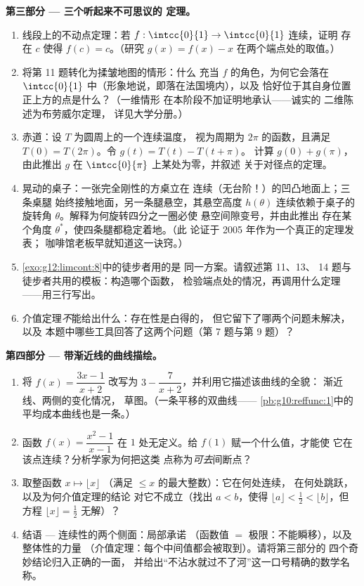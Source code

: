 \begin{problem}
\medskip
\noindent\textbf{第三部分 --- 三个听起来不可思议的
定理。}
\begin{enumerate}[resume]
  \item 线段上的不动点定理：若
        $f : \intcc{0}{1} \to \intcc{0}{1}$ 连续，证明
        存在 $c$ 使得 $f(c) = c$。（研究
        $g(x) = f(x) - x$ 在两个端点处的取值。）
  \item 将第 11 题转化为揉皱地图的情形：什么
        充当 $f$ 的角色，为何它会落在
        $\intcc{0}{1}$ 中（形象地说，即落在法国境内），以及
        恰好位于其自身位置正上方的点是什么？（一维情形
        在本阶段不加证明地承认——诚实的
        二维陈述为布劳威尔定理，
        详见大学分册。）
  \item 赤道：设 $T$ 为圆周上的一个连续温度，
        视为周期为 $2\pi$ 的函数，且满足
        $T(0) = T(2\pi)$。令 $g(t) = T(t) - T(t + \pi)$。
        计算 $g(0) + g(\pi)$，由此推出 $g$
        在 $\intcc{0}{\pi}$ 上某处为零，并叙述
        关于对径点的定理。
  \item 晃动的桌子：一张完全刚性的方桌立在
        连续（无台阶！）的凹凸地面上；三条桌腿
        始终接触地面，另一条腿悬空，其悬空高度 $h(\theta)$
        连续依赖于桌子的旋转角
        $\theta$。解释为何旋转四分之一圈必使
        悬空间隙变号，并由此推出
        存在某个角度 $\theta^*$，使四条腿都稳定着地。（此
        论证于 2005 年作为一个真正的定理发表；
        咖啡馆老板早就知道这一诀窍。）
  \item \cref{exo:g12:limcont:8}中的徒步者用的是
        同一方案。请叙述第 11、13、
        14 题与徒步者共用的模板：构造哪个函数，
        检验端点处的情况，再调用什么定理——用三行写出。
  \item 介值定理\emph{不}能给出什么：存在性是白得的，
        但它留下了哪两个问题未解决，以及
        本题中哪些工具回答了这两个问题（第 7 题与第 9 题）？
\end{enumerate}

\medskip
\noindent\textbf{第四部分 --- 带渐近线的曲线描绘。}
\begin{enumerate}[resume]
  \item 将 $f(x) = \dfrac{3x - 1}{x + 2}$ 改写为
        $3 - \dfrac{7}{x + 2}$，并利用它描述该曲线的全貌：
        渐近线、两侧的变化情况，
        草图。（一条平移的双曲线——
        \cref{pb:g10:reffunc:1}中的平均成本曲线也是一条。）
  \item 函数 $f(x) = \dfrac{x^2 - 1}{x - 1}$ 在
        $1$ 处无定义。给 $f(1)$ 赋一个什么值，才能使
        它在该点连续？分析学家为何把这类
        点称为\emph{可去}间断点？
  \item 取整函数 $x \mapsto \lfloor x \rfloor$
        （满足 $\leq x$ 的最大整数）：它在何处连续，
        在何处跳跃，以及为何介值定理的结论
        对它不成立（找出 $a < b$，使得
        $\lfloor a \rfloor < \frac12 < \lfloor b \rfloor$，但
        方程 $\lfloor x \rfloor = \frac12$ 无解）？
  \item 结语 --- 连续性的两个侧面：局部承诺
        （函数值 $=$ 极限：不能瞬移），以及整体性的力量
        （介值定理：每个中间值都会被取到）。请将第三部分的
        四个奇妙结论归入正确的一面，
        并给出“不沾水就过不了河”这一口号精确的数学名称。
\end{enumerate}
\end{problem}
